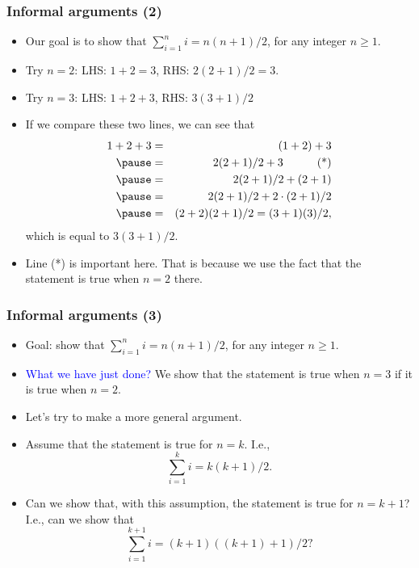 \begin{frame}\frametitle{Informal arguments (2)}
  \begin{itemize}
  \item Our goal is to show that $\sum_{i=1}^n i = n(n+1)/2$, for any
    integer $n\geq 1$.
  \item Try $n=2$: LHS: $1+2=3$, RHS: $2(2+1)/2 = 3$.
  \item Try $n=3$: LHS: $1+2+3$, RHS: $3(3+1)/2$ \pause
  \item If we compare these two lines, we can see that
    \begin{eqnarray*}
      1+2+3 &=& (1+2)+3 \\ \pause
      &=& 2(2+1)/2 + 3 \mbox{\ \ \ \ \ \ \ \ \ (*)} \\ \pause
      &=& 2(2+1)/2 + (2+1) \\ \pause
      &=& 2(2+1)/2 + 2\cdot(2+1)/2 \\ \pause
      &=& (2+2)(2+1)/2 = (3+1)(3)/2,
    \end{eqnarray*}
    which is equal to $3(3+1)/2$. \pause
  \item Line (*) is important here.  That is because we use the fact
    that the statement is true when $n=2$ there.
  \end{itemize}
\end{frame}

\begin{frame}\frametitle{Informal arguments (3)}
  \begin{itemize}
  \item Goal: show that $\sum_{i=1}^n i = n(n+1)/2$, for any integer
    $n\geq 1$.
  \item \textcolor{blue}{What we have just done?} \pause We show that
    the statement is true when $n=3$ if it is true when $n=2$. \pause
  \item Let's try to make a more general argument. \pause
  \item Assume that the statement is true for $n=k$.  I.e.,
    \[ \sum_{i=1}^k i = k(k+1)/2. \] \pause
  \item Can we show that, with this assumption, the statement is true
    for $n=k+1$?  I.e., can we show that
    \[ \sum_{i=1}^{k+1} i = (k+1)((k+1)+1)/2 ? \]
  \end{itemize}
\end{frame}

